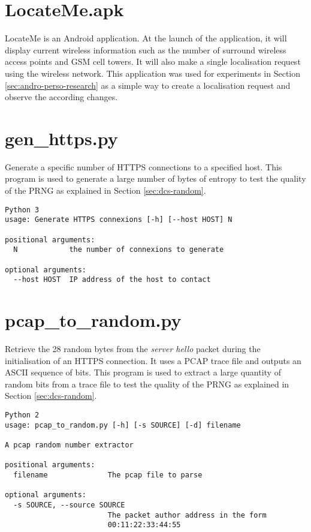 \section{LocateMe.apk}

LocateMe is an Android application.
At the launch of the application, it will display current wireless information such as the number of surround wireless access points and GSM cell towers.
It will also make a single localisation request using the wireless network.
This application was used for experiments in Section \ref{sec:andro-perso-research} as a simple way to create a localisation request and observe the according changes.


\section{gen\_https.py}

Generate a specific number of HTTPS connections to a specified host.
This program is used to generate a large number of bytes of entropy to test the quality of the PRNG as explained in Section \ref{sec:dcs-random}.

\begin{verbatim}
Python 3 
usage: Generate HTTPS connexions [-h] [--host HOST] N

positional arguments:
  N            the number of connexions to generate

optional arguments:
  --host HOST  IP address of the host to contact
\end{verbatim}

\section{pcap\_to\_random.py}

Retrieve the 28 random bytes from the \emph{server hello} packet during the initialisation of an HTTPS connection.
It uses a PCAP trace file and outputs an ASCII sequence of bits.
This program is used to extract a large quantity of random bits from a trace file to test the quality of the PRNG as explained in Section \ref{sec:dcs-random}.

\begin{verbatim}
Python 2
usage: pcap_to_random.py [-h] [-s SOURCE] [-d] filename

A pcap random number extractor

positional arguments:
  filename              The pcap file to parse

optional arguments:
  -s SOURCE, --source SOURCE
                        The packet author address in the form
                        00:11:22:33:44:55
\end{verbatim}


